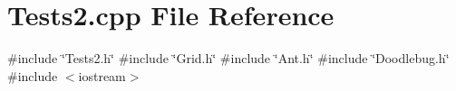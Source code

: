 \section{Tests2.\+cpp File Reference}
\label{Tests2_8cpp}
{\ttfamily \#include \char`\"{}Tests2.\+h\char`\"{}}\newline
{\ttfamily \#include \char`\"{}Grid.\+h\char`\"{}}\newline
{\ttfamily \#include \char`\"{}Ant.\+h\char`\"{}}\newline
{\ttfamily \#include \char`\"{}Doodlebug.\+h\char`\"{}}\newline
{\ttfamily \#include $<$iostream$>$}\newline
